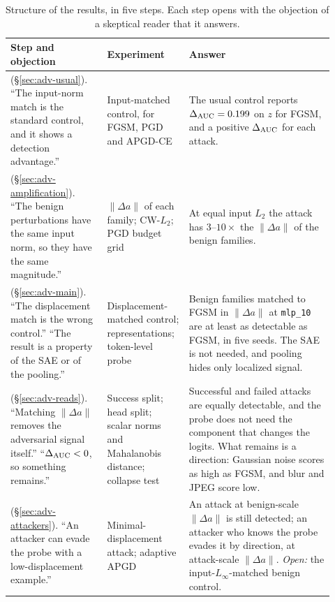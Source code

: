 \documentclass[../ppgc-tese.tex]{subfiles}
\begin{document}
\begin{table}[ht]
  \centering
  \caption{Structure of the results, in five steps. Each step opens with the
  objection of a skeptical reader that it answers.}
  \label{tab:adv-flow}
  \small
  \begin{tabular}{@{}>{\raggedright\arraybackslash}p{0.28\linewidth}>{\raggedright\arraybackslash}p{0.22\linewidth}>{\raggedright\arraybackslash}p{0.42\linewidth}@{}}
    \toprule
    Step and objection & Experiment & Answer \\
    \midrule
    1 (\S\ref{sec:adv-usual}). ``The input-norm match is the standard control, and it shows a detection advantage.'' & Input-matched control, for FGSM, PGD and APGD-CE & The usual control reports $\Delta_{\mathrm{AUC}}=0.199$ on $z$ for FGSM, and a positive $\Delta_{\mathrm{AUC}}$ for each attack. \\
    \addlinespace
    2 (\S\ref{sec:adv-amplification}). ``The benign perturbations have the same input norm, so they have the same magnitude.'' & $\lVert\Delta a\rVert$ of each family; CW-$L_2$; PGD budget grid & At equal input $L_2$ the attack has $3$--$10\times$ the $\lVert\Delta a\rVert$ of the benign families. \\
    \addlinespace
    3 (\S\ref{sec:adv-main}). ``The displacement match is the wrong control.'' ``The result is a property of the SAE or of the pooling.'' & Displacement-matched control; representations; token-level probe & Benign families matched to FGSM in $\lVert\Delta a\rVert$ at \texttt{mlp\_10} are at least as detectable as FGSM, in five seeds. The SAE is not needed, and pooling hides only localized signal. \\
    \addlinespace
    4 (\S\ref{sec:adv-reads}). ``Matching $\lVert\Delta a\rVert$ removes the adversarial signal itself.'' ``$\Delta_{\mathrm{AUC}}<0$, so something remains.'' & Success split; head split; scalar norms and Mahalanobis distance; collapse test & Successful and failed attacks are equally detectable, and the probe does not need the component that changes the logits. What remains is a direction: Gaussian noise scores as high as FGSM, and blur and JPEG score low. \\
    \addlinespace
    5 (\S\ref{sec:adv-attackers}). ``An attacker can evade the probe with a low-displacement example.'' & Minimal-displacement attack; adaptive APGD & An attack at benign-scale $\lVert\Delta a\rVert$ is still detected; an attacker who knows the probe evades it by direction, at attack-scale $\lVert\Delta a\rVert$. \emph{Open:} the input-$L_\infty$-matched benign control. \\
    \bottomrule
  \end{tabular}
\end{table}
\end{document}
